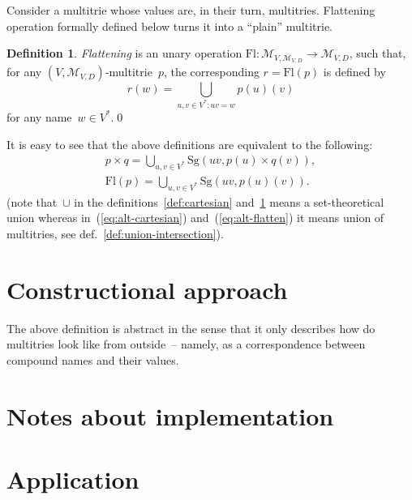 \documentclass{article}
\theoremstyle{definition}
\newtheorem{Df}{Definition}
\newcommand{\set}[1]{\mathcal{#1}}
\newcommand{\setmt}[2]{\set{M}_{#1,#2}}
\newcommand{\flatten}{\mathrm{Fl}}
\newcommand{\singleleaf}{\mathrm{Sg}}
\begin{document}
Consider a multitrie whose values are, in their turn, multitries.
Flattening operation formally defined below turns it into a ``plain'' multitrie.
\begin{Df}\label{def:flatten}
\emph{Flattening} is an unary operation $\flatten : \setmt{V}{\setmt{V}{D}}
\to\setmt{V}{D}$, such that, for any $(V,\setmt{V}{D})$-multitrie~$p$, the
corresponding $r=\flatten(p)$ is defined by
\[
  r(w) = \bigcup_{u,v\in V^\ast: uv = w} p(u)(v)
\]
for any name~$w\in V^\ast$.\qed
\end{Df}

It is easy to see that the above definitions are equivalent to the following:
\begin{eqnarray}
  \label{eq:alt-cartesian}
  p\times q =
    \bigcup_{u,v\in V^\ast} \singleleaf(uv, p(u) \times q(v)) ,\\
  \label{eq:alt-flatten}
  \flatten(p) =
    \bigcup_{u,v\in V^\ast} \singleleaf(uv, p(u)(v)) .
\end{eqnarray}
(note that~$\cup$ in the definitions~\ref{def:cartesian} and~\ref{def:flatten}
means a set-theoretical union whereas in~(\ref{eq:alt-cartesian})
and~(\ref{eq:alt-flatten}) it means union of multitries, see
def.~\ref{def:union-intersection}).

\section{Constructional approach}

The above definition is abstract in the sense that it only describes how do
multitries look like from outside~-- namely, as a correspondence between
compound names and their values.

\section{Notes about implementation}

\section{Application}
\end{document}
